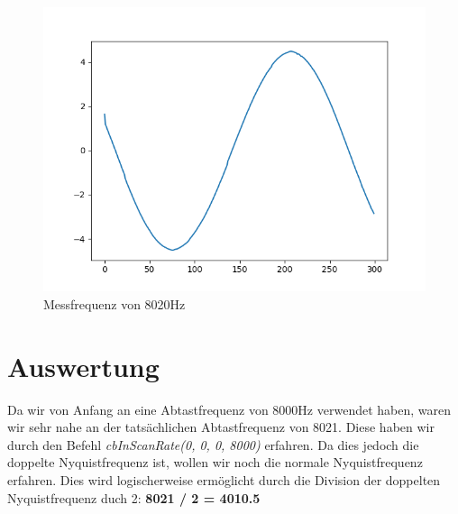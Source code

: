\documentclass[12pt, oneside, a4paper, \docLanguage]{report}
\begin{document}
\begin{figure}[H]
   \begin{minipage}[b]{.5\linewidth} %
      \includegraphics[width=\linewidth]{media/8020Hz}
      \caption{Messfrequenz von 8020Hz}
   \end{minipage}
\end{figure}

\newpage
\section{Auswertung}
\label{chap:VERSUCH_5_AUSWERTUNG}
Da wir von Anfang an eine Abtastfrequenz von 8000Hz verwendet haben, waren wir sehr nahe an der tatsächlichen Abtastfrequenz von 8021.
Diese haben wir durch den Befehl 
\newline
\textit{cbInScanRate(0, 0, 0, 8000)} erfahren. 
\newline
Da dies jedoch die doppelte Nyquistfrequenz ist, wollen wir noch die normale Nyquistfrequenz erfahren.
\newline
Dies wird logischerweise ermöglicht durch die Division der doppelten Nyquistfrequenz duch 2:
\newline
\newline
\textbf{8021 / 2 = 4010.5}
\newline
\newline
\end{document}
